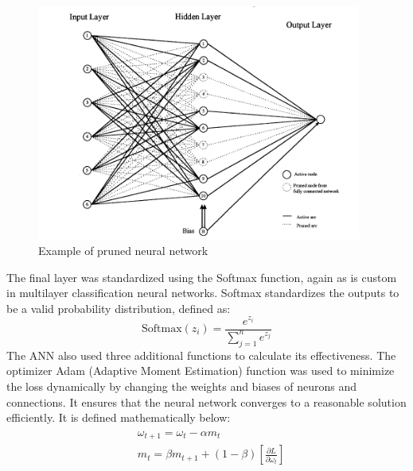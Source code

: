 \documentclass{mcmthesis}
\begin{document}
\begin{figure} [H]
    \centering
    \includegraphics[width=0.95\textwidth]{prunes-nn-vis}
    \caption{Example of pruned neural network}
    \label{exampleID}
    \label{figure: NN}
\end{figure}

The final layer was standardized using the Softmax function, again as is custom in multilayer classification neural networks. Softmax standardizes the outputs to be a valid probability distribution, defined as:
\begin{equation}\label{eq:softmax}
    \text{Softmax}(z_i) = \frac{e^{z_i}}{\sum_{j=1}^{n} e^{z_j}}
\end{equation}
The ANN also used three additional functions to calculate its effectiveness. The optimizer Adam (Adaptive Moment Estimation) function was used to minimize the loss dynamically by changing the weights and biases of neurons and connections. It ensures that the neural network converges to a reasonable solution efficiently. It is defined mathematically below:
\begin{align}\label{eq:adam func}
    \begin{split}
    &\omega_{t+1}=\omega_t-\alpha m_t\\
    &m_t = \beta m_{t+1} + (1-\beta) \left[\frac{\partial L}{\partial \omega_t} \right]
    \end{split}
\end{align}
\end{document}
